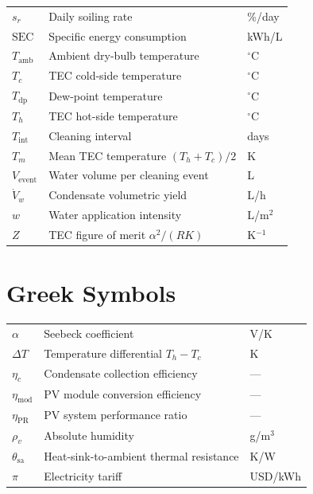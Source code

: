 \documentclass[12pt,a4paper]{report}
\numberwithin{equation}{chapter}
\numberwithin{figure}{chapter}
\numberwithin{table}{chapter}
\newcommand{\degC}{$^\circ$C}
\begin{document}
\begin{tabular}{@{}lll@{}}
$s_r$                  & Daily soiling rate                             & \%/day \\
$\mathrm{SEC}$         & Specific energy consumption                    & kWh/L \\
$T_\mathrm{amb}$       & Ambient dry-bulb temperature                   & \degC \\
$T_c$                  & TEC cold-side temperature                      & \degC \\
$T_\mathrm{dp}$        & Dew-point temperature                          & \degC \\
$T_h$                  & TEC hot-side temperature                       & \degC \\
$T_\mathrm{int}$       & Cleaning interval                              & days \\
$T_m$                  & Mean TEC temperature $(T_h+T_c)/2$             & K \\
$V_\mathrm{event}$     & Water volume per cleaning event                & L \\
$\dot{V}_w$            & Condensate volumetric yield                    & L/h \\
$w$                    & Water application intensity                    & L/m$^2$ \\
$Z$                    & TEC figure of merit $\alpha^2/(RK)$            & K$^{-1}$ \\
\end{tabular}

\vspace{1em}
\section*{Greek Symbols}

\begin{tabular}{@{}lll@{}}
$\alpha$               & Seebeck coefficient                            & V/K \\
$\Delta T$             & Temperature differential $T_h - T_c$           & K \\
$\eta_c$               & Condensate collection efficiency               & --- \\
$\eta_\mathrm{mod}$    & PV module conversion efficiency                & --- \\
$\eta_\mathrm{PR}$     & PV system performance ratio                    & --- \\
$\rho_v$               & Absolute humidity                              & g/m$^3$ \\
$\theta_\mathrm{sa}$   & Heat-sink-to-ambient thermal resistance        & K/W \\
$\pi$                  & Electricity tariff                             & USD/kWh \\
\end{tabular}
\end{document}
